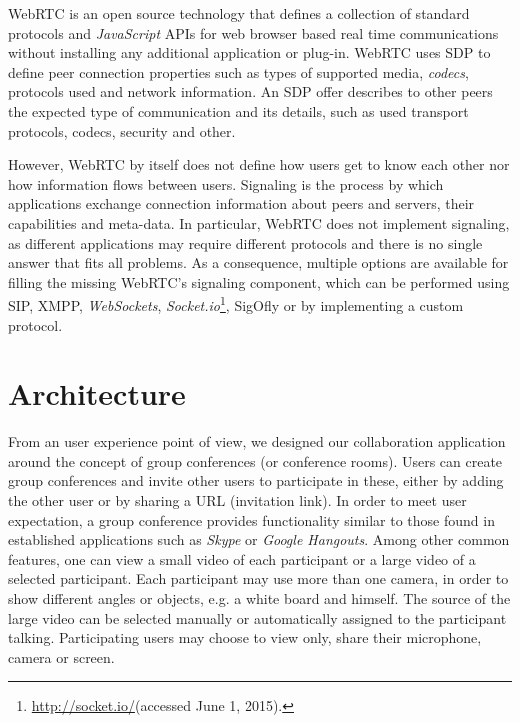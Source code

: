 \documentclass[10pt,conference]{IEEEtran}
\begin{document}
\gls{WebRTC} is an open source technology that defines a collection of standard protocols and \emph{JavaScript} \gls{API}s for web browser based real time communications without installing any additional application or plug-in. 
\gls{WebRTC} uses \gls{SDP} \cite{rfc4566} to define peer connection properties such as types of supported media, \emph{codecs}, protocols used and network information. An \gls{SDP} offer describes to other peers the expected type of communication and its details, such as used transport protocols, codecs, security and other.



However, \gls{WebRTC} by itself does not define how users get to know each other nor how information flows between users. 
  Signaling is the process by which applications exchange connection information about peers and servers, their capabilities and meta-data.
  In particular, \gls{WebRTC} does not implement signaling, as different applications may require different protocols and there is no single answer that fits all problems.
  As a consequence, multiple options are available for filling the missing \gls{WebRTC}'s signaling component, which can be performed using \gls{SIP}\cite{rfc3261}, \gls{XMPP}, \emph{WebSockets}, \emph{Socket.io}\footnote{\url{http://socket.io/}(accessed June 1, 2015).}, \gls{SigOfly}\cite{sigofly} or by implementing a custom protocol.

 	











\section{Architecture}
\label{chapter:architecture}

From an user experience point of view, we designed our collaboration application around the concept of group conferences (or conference rooms).
Users can create group conferences and invite other users to participate in these, either by adding the other user or by sharing a \gls{URL} (invitation link).
In order to meet user expectation, a group conference provides functionality similar to those found in established applications such as \emph{Skype} or \emph{Google Hangouts}.
Among other common features, one can view a small video of each participant or a large video of a selected participant.
Each participant may use more than one camera, in order to show different angles or objects, e.g. a white board and himself.
The source of the large video can be selected manually or automatically assigned to the participant talking.
Participating users may choose to view only, share their microphone, camera or screen.
\end{document}
